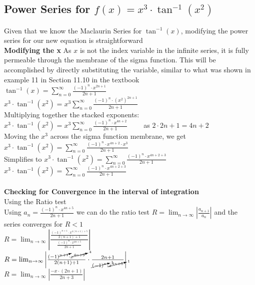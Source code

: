 \documentclass{article}
\begin{document}
\subsection*{Power Series for $f(x)=x^3\cdot\tan^{-1}(x^2)$}
Given that we know the Maclaurin Series for $\tan^{-1}(x)$, modifying the power series for our new equation is straightforward
\\\textbf{Modifying the x}
As $x$ is not the index variable in the infinite series, it is fully permeable through the membrane of the sigma function. This will be accomplished by directly substituting the variable, similar to what was shown in example 11 in Section 11.10 in the textbook
\\$\tan^{-1}(x)=\sum_{n=0}^{\infty}\frac{(-1)^n\cdot x^{2n+1}}{2n+1}$
\\$x^3 \cdot \tan^{-1}(x^2)=x^3\sum_{n=0}^{\infty}\frac{(-1)^n\cdot (x^2)^{2n+1}}{2n+1}$
\\Multiplying together the stacked exponents: $x^3\cdot \tan^{-1}(x^2)=x^3\sum_{n=0}^{\infty}\frac{(-1)^n\cdot x^{4n+2}}{2n+1}\qquad$ as $2\cdot 2n+1=4n+2$
\\[0.1in]Moving the $x^3$ across the sigma function membrane, we get $x^3\cdot \tan^{-1}(x^2)=\sum_{n=0}^{\infty}\frac{(-1)^n\cdot x^{4n+2}\cdot x^3}{2n+1}\qquad$
\\[0.1in]Simplifies to $x^3\cdot \tan^{-1}(x^2)=\sum_{n=0}^{\infty}\frac{(-1)^n\cdot x^{4n+2+3}}{2n+1}\qquad$
\\[0.1in]$x^3\cdot \tan^{-1}(x^2)=\sum_{n=0}^{\infty}\frac{(-1)^n\cdot x^{4n+2+3}}{2n+1}\qquad$
\\[0.1in]
\\[0.1in]\textbf{Checking for Convergence in the interval of integration} 
\\[0.05in]Using the Ratio test
\\[0.05in]Using $a_n = \frac{(-1)^n\cdot x^{4n+5}}{2n+1}$ we can do the ratio test $R =\lim_{n\to\infty} \left|\frac{a_{n+1}}{a_n}\right|$ and the series converges for $R < 1$
\\[0.05in]$R=\lim_{n\to\infty} \left|\frac{\frac{(-1)^{n+1}\cdot x^{4{(n+1)}+5}}{2{(n+1)}+1}}{\frac{(-1)^n\cdot x^{4n+5}}{2n+1}}\right|$
\\[0.05in]$R=\lim_{n\to\infty} \left|\frac{(-1)^{\cancelto{}{n+1}}\cdot x^{\cancelto{4}{4n+9}}}{2{(n+1)}+1}\cdot\frac{2n+1}{\cancelto{1}{(-1)^n}\cdot \cancelto{1}{x^{4n+5}}}\right|$
\\[0.05in]$R=\lim_{n\to\infty} \left|\frac{-x\cdot(2n+1)}{2n+3}\right|$
\end{document}
